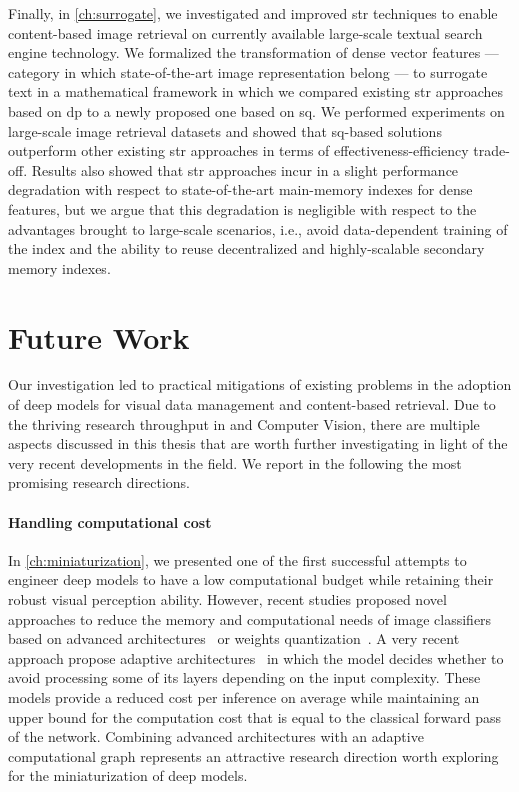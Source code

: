 Finally, in \ref{ch:surrogate}, we investigated and improved \acrfull{str} techniques to enable content-based image retrieval on currently available large-scale textual search engine technology.
We formalized the transformation of dense vector features --- category in which state-of-the-art image representation belong --- to surrogate text in a mathematical framework in which we compared existing \gls{str} approaches based on \acrlong{dp} to a newly proposed one based on \acrfull{sq}.
We performed experiments on large-scale image retrieval datasets and showed that \gls{sq}-based solutions outperform other existing \gls{str} approaches in terms of effectiveness-efficiency trade-off.
Results also showed that \gls{str} approaches incur in a slight performance degradation with respect to state-of-the-art main-memory indexes for dense features, but we argue that this degradation is negligible with respect
 to the advantages brought to large-scale scenarios, i.e., avoid data-dependent training of the index and the ability to reuse decentralized and highly-scalable secondary memory indexes.

\section{Future Work}

Our investigation led to practical mitigations of existing problems in the adoption of deep models for visual data management and content-based retrieval.
Due to the thriving research throughput in  and Computer Vision, there are multiple aspects discussed in this thesis that are worth further investigating in light of the very recent developments in the field.
We report in the following the most promising research directions.

\paragraph{Handling computational cost}
In \ref{ch:miniaturization}, we presented one of the first successful attempts to engineer deep models to have a low computational budget while retaining their robust visual perception ability.
However, recent studies proposed novel approaches to reduce the memory and computational needs of image classifiers based on advanced architectures~\cite{iandola2016squeezenet,howard2017mobilenets} or weights quantization~\cite{rastegari2016xnor}.
A very recent approach propose adaptive architectures~\cite{veit2018convolutional} in which the model decides whether to avoid processing some of its layers depending on the input complexity.
These models provide a reduced cost per inference on average while maintaining an upper bound for the computation cost that is equal to the classical forward pass of the network.
Combining advanced architectures with an adaptive computational graph represents an attractive research direction worth exploring for the miniaturization of deep models.

